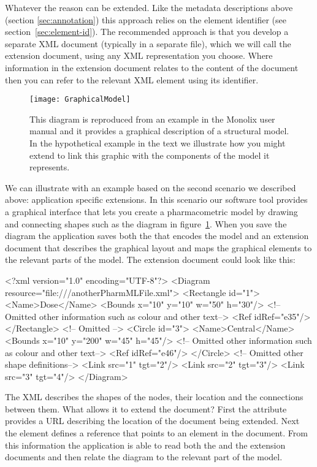 Whatever the reason \pharmml can be extended. Like the metadata
descriptions above (section \ref{sec:annotation}) this approach relies
on the element identifier (see section~\ref{sec:element-id}). The
recommended approach is that you develop a separate XML document
(typically in a separate file), which we will call the extension
document, using any XML representation you choose. Where information
in the extension document relates to the content of the \pharmml
document then you can refer to the relevant XML element using its
identifier.

\begin{figure}[htb]
\centering
  \texttt{[image: GraphicalModel]}
  \caption{This diagram is reproduced from an example in the Monolix
    user manual \cite{Monolix4.1.4UserGuide:2012} and it provides a
    graphical description of a structural model. In the hypothetical
    example in the text we illustrate how you might extend \pharmml to
    link this graphic with the components of the model it represents.}
\label{fig:graphical-model}
\end{figure}

We can illustrate with an example based on the second scenario we
described above: application specific extensions. In this scenario our
software tool provides a graphical interface that lets you create a
pharmacometric model by drawing and connecting shapes such as the
diagram in figure~\ref{fig:graphical-model}. When you save the diagram
the application saves both the \pharmml that encodes the model and an
extension document that describes the graphical layout and maps the
graphical elements to the relevant parts of the model. The extension
document could look like this:
%
\begin{xmlcode}
<?xml version="1.0" encoding="UTF-8"?>
<Diagram resource="file:///anotherPharmMLFile.xml">
    <Rectangle id="1">
        <Name>Dose</Name>
        <Bounds x="10" y="10" w="50" h="30"/>
        <!-- Omitted other information such as colour and other text-->
        <Ref idRef="e35"/>
    </Rectangle>
    <!-- Omitted -->
    <Circle id="3">
        <Name>Central</Name>
        <Bounds x="10" y="200" w="45" h="45"/>
        <!-- Omitted other information such as colour and other text-->
        <Ref idRef="e46"/>
    </Circle>
    <!-- Omitted other shape definitions-->
    <Link src="1" tgt="2"/>
    <Link src="2" tgt="3"/>
    <Link src="3" tgt="4"/>
</Diagram>
\end{xmlcode}
%
The XML describes the shapes of the nodes, their location and the
connections between them. What allows it to extend the \pharmml document?
First the  attribute provides a URL describing
the location of the \pharmml document being extended. Next the
 element defines a reference that points to an element in
the \pharmml document. From this information the application is able
to read both the \pharmml and the extension documents and then relate
the diagram to the relevant part of the model.

